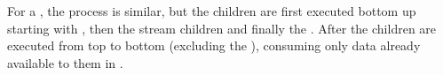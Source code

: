 For a {\splitjoin}, the process is similar, but the children are
first executed bottom up starting with {\joiner}, then the stream
children and finally the {\splitter}. After the children are
executed from top to bottom (excluding the {\splitter}), consuming
only data already available to them in {\Channels}.

\begin{comment}
Using the sample {\pipeline} from Figure
\ref{fig:hierarchical-schedule}(a), the following are phasing
schedules for {\filters} A, B, C and D:

\begin{displaymath} \small
P_A = \left\{
\begin{array}{c}
T_A = \left\{
\begin{array}{c}
A_{A,0} = \left\{ \{A\}, \left[\begin{array}{c} 1 \\ 1 \\ 3 \end{array}\right]\right\} \\
\end{array}\right\}, \\
I_A = \left\{ \right\},  c_A = \left[ \begin{array}{c} 1 \\ 1 \\
3 \end{array} \right], c^i_B = \left[ \begin{array}{c} 0 \\ 0 \\ 0
\end{array} \right]
\end{array}
\right\}
\end{displaymath}

\begin{displaymath} \small
P_B = \left\{
\begin{array}{c}
T_B = \left\{
\begin{array}{c}
A_{B,0} = \left\{ \{B\}, \left[\begin{array}{c} 3 \\ 2 \\ 3 \end{array}\right]\right\} \\
\end{array}\right\}, \\
I_B = \left\{ A^i_{B,0} = \left\{ \{ \}, \left[\begin{array}{c}1 \\ 0 \\ 0 \end{array}\right]\right\} \right\}, \\
c_B = \left[ \begin{array}{c} 3 \\ 2 \\ 3 \end{array} \right],
c^i_B = \left[ \begin{array}{c} 1 \\ 0 \\ 0
\end{array} \right]
\end{array}
\right\}
\end{displaymath}


\end{comment}
